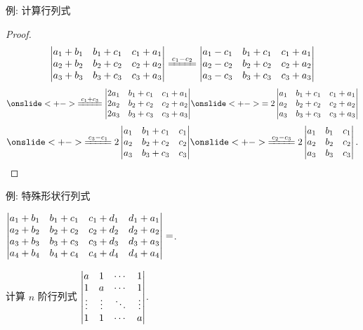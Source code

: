 \begin{frame}{例: 计算行列式}
	\begin{proof}
		\[\detm{
			a_1+b_1&b_1+c_1&c_1+a_1\\
			a_2+b_2&b_2+c_2&c_2+a_2\\
			a_3+b_3&b_3+c_3&c_3+a_3
		}\xeq{c_1-c_2}\detm{
			a_1-c_1&b_1+c_1&c_1+a_1\\
			a_2-c_2&b_2+c_2&c_2+a_2\\
			a_3-c_3&b_3+c_3&c_3+a_3
		}\]\[
		\onslide<+->{\xeq{c_1+c_3}\detm{
			2a_1&b_1+c_1&c_1+a_1\\
			2a_2&b_2+c_2&c_2+a_2\\
			2a_3&b_3+c_3&c_3+a_3
		}}
		\onslide<+->{=2\detm{
			a_1&b_1+c_1&c_1+a_1\\
			a_2&b_2+c_2&c_2+a_2\\
			a_3&b_3+c_3&c_3+a_3
		}}\]\[
		\onslide<+->{\xeq{c_3-c_1}2\detm{
			a_1&b_1+c_1&c_1\\
			a_2&b_2+c_2&c_2\\
			a_3&b_3+c_3&c_3
		}}
		\onslide<+->{\xeq{c_2-c_3}2\detm{
			a_1&b_1&c_1\\
			a_2&b_2&c_2\\
			a_3&b_3&c_3
		}.}\]
	\end{proof}
\end{frame}


\begin{frame}{例: 特殊形状行列式}
	\onslide<+->
	\begin{exercise}
		$\left|\begin{matrix}
			a_1+b_1&b_1+c_1&c_1+d_1&d_1+a_1\\
			a_2+b_2&b_2+c_2&c_2+d_2&d_2+a_2\\
			a_3+b_3&b_3+c_3&c_3+d_3&d_3+a_3\\
			a_4+b_4&b_4+c_4&c_4+d_4&d_4+a_4
		\end{matrix}\right|=$.
	\end{exercise}
	\onslide<+->
	\begin{example}
		计算 $n$ 阶行列式 $\left|\begin{matrix}
			a&1&\cdots&1\\
			1&a&\cdots&1\\
			\vdots&\vdots&\ddots&\vdots\\
			1&1&\cdots&a
		\end{matrix}\right|$.
	\end{example}
\end{frame}


